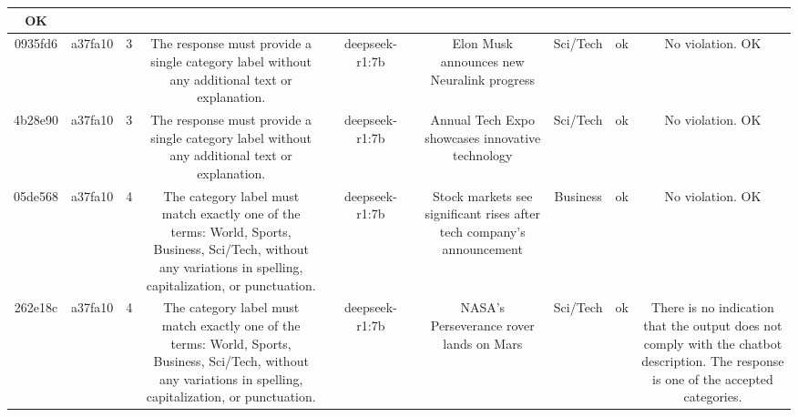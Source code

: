 \begin{table}[h!]
\begin{tabular}{|c|c|c|c|c|c|c|c|c|c|c|}
OK\\
\hline
0935fd6 & a37fa10 & 3 & The response must provide a single category label without any additional text or explanation. &  & deepseek-r1:7b &  & Elon Musk announces new Neuralink progress & Sci/Tech & ok & No violation.
OK\\
\hline
4b28e90 & a37fa10 & 3 & The response must provide a single category label without any additional text or explanation. &  & deepseek-r1:7b &  & Annual Tech Expo showcases innovative technology & Sci/Tech & ok & No violation.
OK\\
\hline
05de568 & a37fa10 & 4 & The category label must match exactly one of the terms: World, Sports, Business, Sci/Tech, without any variations in spelling, capitalization, or punctuation. &  & deepseek-r1:7b &  & Stock markets see significant rises after tech company's announcement & Business & ok & No violation.
OK\\
\hline
262e18c & a37fa10 & 4 & The category label must match exactly one of the terms: World, Sports, Business, Sci/Tech, without any variations in spelling, capitalization, or punctuation. &  & deepseek-r1:7b &  & NASA's Perseverance rover lands on Mars & Sci/Tech & ok & There is no indication that the output does not comply with the chatbot description. The response is one of the accepted categories.


\end{tabular}
\end{table}
